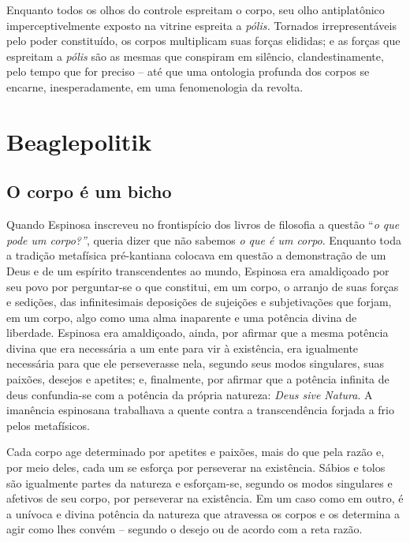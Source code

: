 Enquanto todos os olhos do controle espreitam o corpo, seu olho
antiplatônico imperceptivelmente exposto na vitrine espreita a
\emph{pólis. }Tornados irrepresentáveis pelo poder constituído, os
corpos multiplicam suas forças elididas; e as forças que espreitam a
\emph{pólis} são as mesmas que conspiram em silêncio, clandestinamente,
pelo tempo que for preciso -- até que uma ontologia profunda dos corpos
se encarne, inesperadamente, em uma fenomenologia da revolta.

\chapter{Beaglepolitik}


\section{O corpo é um bicho}

\textbf{}Quando Espinosa inscreveu no frontispício dos livros de
filosofia a questão ``\emph{o que pode um corpo?''}, queria dizer que
não sabemos \emph{o que é um corpo}. Enquanto toda a tradição metafísica
pré-kantiana colocava em questão a demonstração de um Deus e de um
espírito transcendentes ao mundo, Espinosa era amaldiçoado por seu povo
por perguntar-se o que constitui, em um corpo, o arranjo de suas forças
e sedições, das infinitesimais deposições de sujeições e subjetivações
que forjam, em um corpo, algo como uma alma inaparente e uma potência
divina de liberdade. Espinosa era amaldiçoado, ainda, por afirmar que a
mesma potência divina que era necessária a um ente para vir à
existência, era igualmente necessária para que ele perseverasse nela,
segundo seus modos singulares, suas paixões, desejos e apetites; e,
finalmente, por afirmar que a potência infinita de deus confundia-se com
a potência da própria natureza: \emph{Deus sive Natura}. A imanência
espinosana trabalhava a quente contra a transcendência forjada a frio
pelos metafísicos.

Cada corpo age determinado por apetites e paixões, mais do que pela
razão e, por meio deles, cada um se esforça por perseverar na
existência. Sábios e tolos são igualmente partes da natureza e
esforçam-se, segundo os modos singulares e afetivos de seu corpo, por
perseverar na existência. Em um caso como em outro, é a unívoca e divina
potência da natureza que atravessa os corpos e os determina a agir como
lhes convém -- segundo o desejo ou de acordo com a reta razão.

